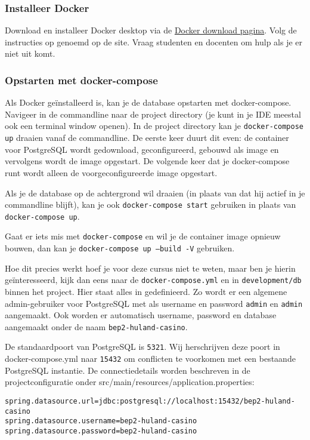\subsubsection{Installeer Docker}
Download en installeer Docker desktop via de 
\href{https://www.docker.com/products/docker-desktop}{Docker download pagina}.
Volg de instructies op genoemd op de site.
Vraag studenten en docenten om hulp als je er niet uit komt.

\subsubsection{Opstarten met docker-compose}
Als Docker geïnstalleerd is, kan je de database opstarten met docker-compose.
Navigeer in de commandline naar de project directory (je kunt in je IDE meestal ook een terminal window openen).
In de project directory kan je \texttt{docker-compose up} draaien vanaf de commandline. 
De eerste keer duurt dit even: de container voor PostgreSQL wordt gedownload, geconfigureerd,
gebouwd als image en vervolgens wordt de image opgestart.
De volgende keer dat je docker-compose runt wordt alleen de voorgeconfigureerde image opgestart.

Als je de database op de achtergrond wil draaien (in plaats van dat hij actief in je commandline blijft),
kan je ook \texttt{docker-compose start} gebruiken in plaats van \texttt{docker-compose up}.

Gaat er iets mis met \texttt{docker-compose} en wil je de container image opnieuw bouwen,
dan kan je \texttt{docker-compose up --build -V} gebruiken.

Hoe dit precies werkt hoef je voor deze cursus niet te weten,
maar ben je hierin geïnteresseerd, kijk dan eens naar de \texttt{docker-compose.yml}
en in \texttt{development/db} binnen het project. Hier staat alles in gedefinieerd.
Zo wordt er een algemene admin-gebruiker voor PostgreSQL met als username en password 
\texttt{admin} en \texttt{admin} aangemaakt. Ook worden er automatisch username, password en database 
aangemaakt onder de naam \texttt{bep2-huland-casino}.

De standaardpoort van PostgreSQL is \texttt{5321}. Wij herschrijven deze poort in docker-compose.yml
naar \texttt{15432} om conflicten te voorkomen met een bestaande PostgreSQL instantie. 
De connectiedetails worden beschreven in de projectconfiguratie onder src/main/resources/application.properties:

\begin{verbatim}
spring.datasource.url=jdbc:postgresql://localhost:15432/bep2-huland-casino
spring.datasource.username=bep2-huland-casino
spring.datasource.password=bep2-huland-casino
\end{verbatim}

